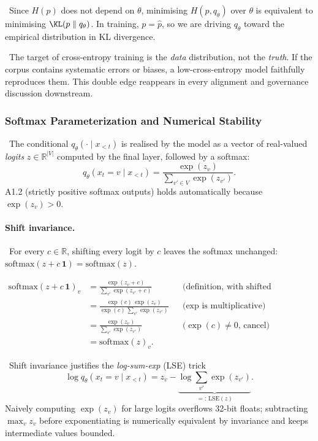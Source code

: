 \Cons\ Since $H(p)$ does not depend on $\theta$, minimising
$H(p, q_\theta)$ over $\theta$ is equivalent to minimising
$\KL(p \parallel q_\theta)$. In training, $p = \hat p$, so we are
driving $q_\theta$ toward the empirical distribution in KL divergence.

\Emp\ The target of cross-entropy training is the \emph{data}
distribution, not the \emph{truth}. If the corpus contains systematic
errors or biases, a low-cross-entropy model faithfully reproduces them.
This double edge reappears in every alignment and governance
discussion downstream.

\subsubsection{Softmax Parameterization and Numerical Stability}

\Def\ The conditional $q_\theta(\cdot \mid x_{<t})$ is realised by the
model as a vector of real-valued \emph{logits}
$z \in \mathbb{R}^{|V|}$ computed by the final layer, followed by a
softmax:
\begin{equation}
q_\theta(x_t = v \mid x_{<t})
  = \frac{\exp(z_v)}{\sum_{v' \in V} \exp(z_{v'})}.
\label{eq:softmax}
\end{equation}
A1.2 (strictly positive softmax outputs) holds automatically because
$\exp(z_v) > 0$.

\paragraph{Shift invariance.}
\Ident\ For every $c \in \mathbb{R}$, shifting every logit by $c$
leaves the softmax unchanged:
$\mathrm{softmax}(z + c\,\mathbf{1}) = \mathrm{softmax}(z)$.

\begin{derivation}
\begin{align}
\mathrm{softmax}(z + c\,\mathbf{1})_v
  &= \frac{\exp(z_v + c)}{\sum_{v'} \exp(z_{v'} + c)}
  && \text{(definition, with shifted argument)} \\
  &= \frac{\exp(c)\,\exp(z_v)}{\exp(c)\,\sum_{v'} \exp(z_{v'})}
  && \text{($\exp$ is multiplicative)} \\
  &= \frac{\exp(z_v)}{\sum_{v'} \exp(z_{v'})}
  && \text{($\exp(c) \neq 0$, cancel)} \\
  &= \mathrm{softmax}(z)_v.
\end{align}
\end{derivation}

\Cons\ Shift invariance justifies the \emph{log-sum-exp} (LSE) trick
\begin{equation}
\log q_\theta(x_t = v \mid x_{<t}) = z_v - \underbrace{\log \sum_{v'} \exp(z_{v'})}_{=:\,\mathrm{LSE}(z)}.
\end{equation}
Naively computing $\exp(z_v)$ for large logits overflows 32-bit floats;
subtracting $\max_v z_v$ before exponentiating is numerically equivalent
by invariance and keeps intermediate values bounded.


